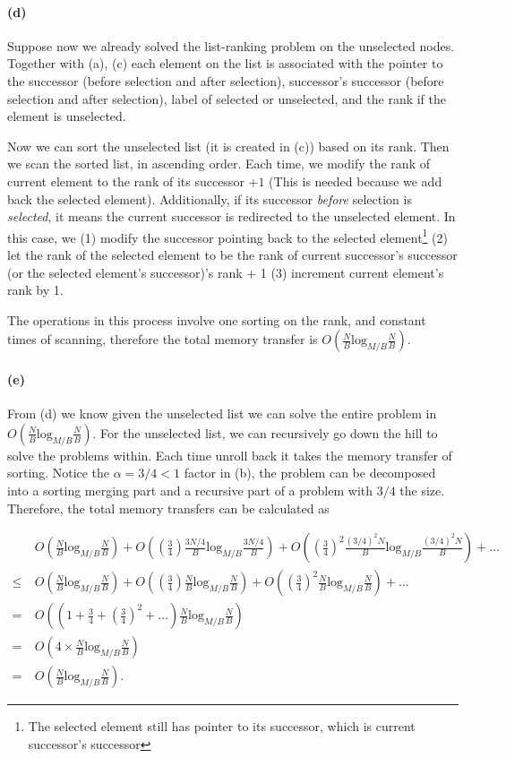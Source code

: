 \documentclass[12pt]{article}
\begin{document}
\paragraph{(d)}
Suppose now we already solved the list-ranking problem on the unselected nodes. Together with (a), (c) each element on the list is associated with the pointer to the successor (before selection and after selection), successor's successor (before selection and after selection), label of selected or unselected, and the rank if the element is unselected. 

Now we can sort the unselected list (it is created in (c)) based on its rank. Then we scan the sorted list, in ascending order. Each time, we modify the rank of current element to the rank of its successor $+1$ (This is needed because we add back the selected element). Additionally, if its successor \emph{before} selection is \emph{selected}, it means the current successor is redirected to the unselected element. In this case, we (1) modify the successor pointing back to the selected element\footnote{The selected element still has pointer to its successor, which is current successor's successor} (2) let the rank of the selected element to be the rank of current successor's successor (or the selected element's successor)'s rank + 1 (3) increment current element's rank by 1. 

The operations in this process involve one sorting on the rank, and constant times of scanning, therefore the total memory transfer is $O(\frac{N}{B}\text{log}_{M/B}\frac{N}{B})$. 

\paragraph{(e)} From (d) we know given the unselected list we can solve the entire problem in $O(\frac{N}{B}\text{log}_{M/B}\frac{N}{B})$. For the unselected list, we can recursively go down the hill to solve the problems within. Each time unroll back it takes the memory transfer of sorting. Notice the $\alpha=3/4<1$ factor in (b), the problem can be decomposed into a sorting merging part and a recursive part of a problem with $3/4$ the size. Therefore, the total memory transfers can be calculated as 

\begin{align*}
&O(\frac{N}{B}\text{log}_{M/B}\frac{N}{B}) + O(\left(\frac{3}{4}\right)\frac{3N/4}{B}\text{log}_{M/B}\frac{3N/4}{B}) + O(\left(\frac{3}{4}\right)^2\frac{(3/4)^2N}{B}\text{log}_{M/B}\frac{(3/4)^2N}{B}) + \dots\\
\leq \:& O(\frac{N}{B}\text{log}_{M/B}\frac{N}{B}) + O(\left(\frac{3}{4}\right)\frac{N}{B}\text{log}_{M/B}\frac{N}{B}) + O(\left(\frac{3}{4}\right)^2\frac{N}{B}\text{log}_{M/B}\frac{N}{B}) + \dots\\
= \:& O\left((1+\frac{3}{4} + \left(\frac{3}{4}\right)^2 + ...) \frac{N}{B}\text{log}_{M/B}\frac{N}{B}\right)\\
= \:& O\left(4\times \frac{N}{B}\text{log}_{M/B}\frac{N}{B}\right)\\
= \:& O(\frac{N}{B}\text{log}_{M/B}\frac{N}{B}).
\end{align*}
\newpage
\end{document}
